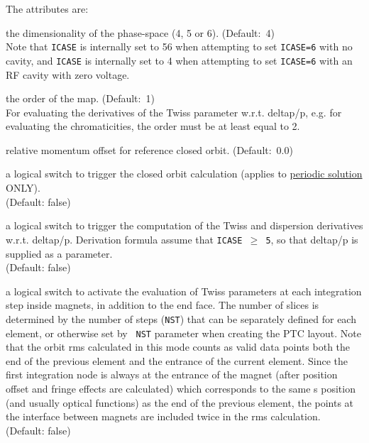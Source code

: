 The attributes are: 
\begin{madlist}

  the dimensionality of the phase-space (4, 5 or
  6). (Default:~4)\\ Note that {\tt ICASE} is internally set to 56 when
  attempting to set {\tt ICASE=6} with no cavity, and {\tt ICASE} is
  internally set to 4 when attempting to set {\tt ICASE=6} with an RF
  cavity with zero voltage.

  the order of the map. (Default:~1)\\ For evaluating the
  derivatives of the Twiss parameter w.r.t. deltap/p, e.g. for
  evaluating the chromaticities, the order must be at least equal to 2.

  relative momentum offset for reference closed orbit. (Default:~0.0) 

  a logical switch to trigger the closed orbit calculation
  (applies to \hyperlink{Periodic_Solution}{periodic solution} ONLY). \\  
  (Default: false)

  a logical switch to trigger the computation of the Twiss and
  dispersion derivatives w.r.t. deltap/p. Derivation formula assume that
  {\tt ICASE $\ge$ 5}, so that deltap/p is supplied as a parameter. \\
  (Default: false)

  a logical switch to activate the evaluation of Twiss parameters at each
  integration step inside magnets, in addition to the end face.  The
  number of slices is determined by the number of steps ({\tt NST}) that
  can be separately defined for each element, or otherwise set by {\tt
    NST} parameter when creating the PTC layout.  Note that the orbit
  rms calculated in this mode counts as valid data points both the end
  of the previous element and the entrance of the current element. Since
  the first integration node is always at the entrance of the magnet
  (after position offset and fringe effects are calculated) which
  corresponds to the same s position (and usually optical functions) as
  the end of the previous element, the points at the interface between
  magnets are included twice in the rms calculation. \\ 
  (Default: false)


\end{madlist}
